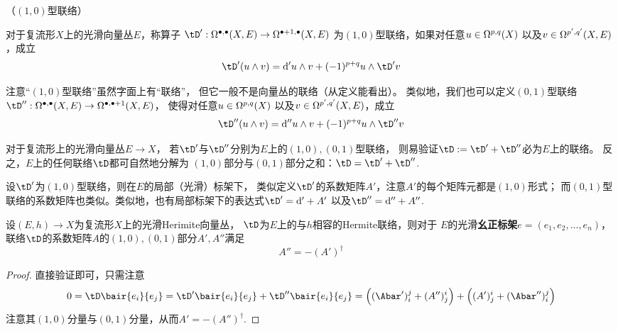 \begin{definition}（$(1,0)$型联络）

对于复流形$X$上的光滑向量丛$E$，称算子
$\tD':\Omg^{\bullet,\bullet}(X,E)\to\Omg^{\bullet+1,\bullet}(X,E)$
为$(1,0)$型联络，如果对任意$u\in\Omega^{p,q}(X)$
以及$v\in\Omega^{p',q'}(X,E)$，成立
$$
  \tD'(u\wedge v)
= \td'u\wedge v+(-1)^{p+q}u\wedge\tD' v
$$
\end{definition}

注意“$(1,0)$型联络”虽然字面上有“联络”，
但它一般不是向量丛的联络（从定义能看出）。
类似地，我们也可以定义$(0,1)$型联络
$\tD'':\Omg^{\bullet,\bullet}(X,E)\to\Omg^{\bullet,\bullet+1}(X,E)$，
使得对任意$u\in\Omega^{p,q}(X)$
以及$v\in\Omega^{p',q'}(X,E)$，成立
$$
  \tD''(u\wedge v)
= \td''u\wedge v+(-1)^{p+q}u\wedge\tD'' v
$$

\begin{rem}对于复流形上的光滑向量丛$E\to X$，
若$\tD'$与$\tD''$分别为$E$上的$(1,0),(0,1)$型联络，
则易验证$\tD:=\tD'+\tD''$必为$E$上的联络。
反之，$E$上的任何联络$\tD$都可自然地分解为
$(1,0)$部分与$(0,1)$部分之和：$\tD=\tD'+\tD''$.
\end{rem}

设$\tD'$为$(1,0)$型联络，则在$E$的局部（光滑）标架下，
类似定义$\tD'$的系数矩阵$A'$，注意$A'$的每个矩阵元都是$(1,0)$形式；
而$(0,1)$型联络的系数矩阵也类似。类似地，也有局部标架下的表达式$\tD'=\td'+A'$
以及$\tD''=\td''+A''$.


\begin{prop}
设$(E,h)\to X$为复流形$X$上的光滑Herimite向量丛，
$\tD$为$E$上的与$h$相容的Hermite联络，则对于
$E$的光滑\textbf{幺正标架}$e=(e_1,e_2,...,e_n)$，
联络$\tD$的系数矩阵$A$的$(1,0),(0,1)$部分$A',A''$满足
$$A''=-(A')^\dag$$
\end{prop}

\begin{proof}直接验证即可，只需注意
$$
  0=\tD\bair{e_i}{e_j}
   =\tD'\bair{e_i}{e_j}+\tD''\bair{e_i}{e_j}
   =\left((\Abar')^j_i+(A'')^i_j\right)
   +\left((A')^i_j+(\Abar'')^j_i\right)
$$
注意其$(1,0)$分量与$(0,1)$分量，从而$A'=-(A'')^\dag$.
\end{proof}


